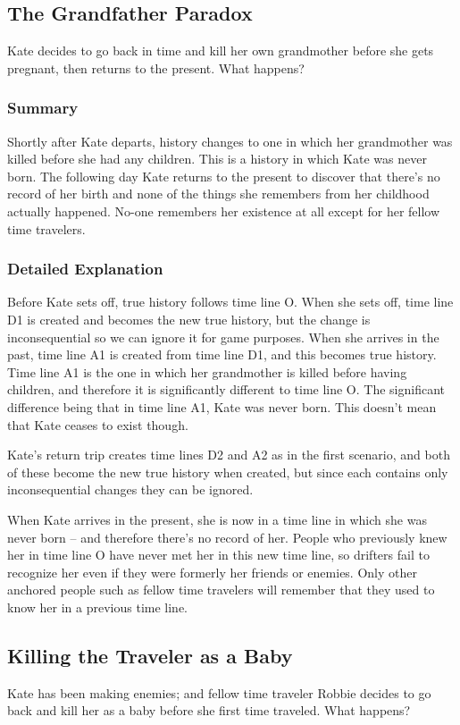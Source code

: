 \begin{multicols*}{2}
\subsection{The Grandfather Paradox}
Kate decides to go back in time and kill her own grandmother before she gets pregnant, then returns to the present. What happens?

\subsubsection{Summary}
Shortly after Kate departs, history changes to one in which her grandmother was killed before she had any children. This is a history in which Kate was never born. The following day Kate returns to the present to discover that there’s no record of her birth and none of the things she remembers from her childhood actually happened. No-one remembers her existence at all except for her fellow time travelers.

\subsubsection{Detailed Explanation}
Before Kate sets off, true history follows time line O. When she sets off, time line D1 is created and becomes the new true history, but the change is inconsequential so we can ignore it for game purposes. When she arrives in the past, time line A1 is created from time line D1, and this becomes true history. Time line A1 is the one in which her grandmother is killed before having children, and therefore it is significantly different to time line O. The significant difference being that in time line A1, Kate was never born. This doesn’t mean that Kate ceases to exist though.

Kate’s return trip creates time lines D2 and A2 as in the first scenario, and both of these become the new true history when created, but since each contains only inconsequential changes they can be ignored.

When Kate arrives in the present, she is now in a time line in which she was never born – and therefore there’s no record of her. People who previously knew her in time line O have never met her in this new time line, so drifters fail to recognize her even if they were formerly her friends or enemies. Only other anchored people such as fellow time travelers will remember that they used to know her in a previous time line.

\subsection{Killing the Traveler as a Baby}
Kate has been making enemies; and fellow time traveler Robbie decides to go back and kill her as a baby before she first time traveled. What happens? 


\end{multicols*}
